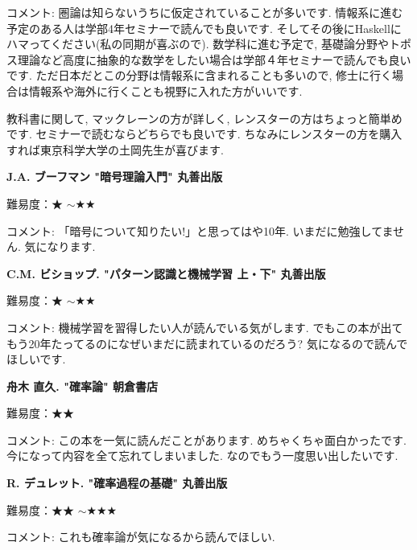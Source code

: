 コメント: 圏論は知らないうちに仮定されていることが多いです. 情報系に進む予定のある人は学部4年セミナーで読んでも良いです.  そしてその後にHaskellにハマってください(私の同期が喜ぶので). 数学科に進む予定で, 基礎論分野やトポス理論など高度に抽象的な数学をしたい場合は学部４年セミナーで読んでも良いです. ただ日本だとこの分野は情報系に含まれることも多いので, 修士に行く場合は情報系や海外に行くことも視野に入れた方がいいです. 

教科書に関して, マックレーンの方が詳しく, レンスターの方はちょっと簡単めです. セミナーで読むならどちらでも良いです. ちなみにレンスターの方を購入すれば東京科学大学の土岡先生が喜びます. 
\vspace{8pt}

\textbf{J.A. ブーフマン "暗号理論入門" 丸善出版}  　\vspace{-6pt} 

難易度：★ $\sim$★★\vspace{-6pt} 

コメント: 「暗号について知りたい!」と思ってはや10年. いまだに勉強してません. 気になります. 
\vspace{8pt}


\textbf{C.M. ビショップ. "パターン認識と機械学習 上・下" 丸善出版}  　\vspace{-6pt} 

難易度：★ $\sim$★★\vspace{-6pt} 

コメント: 機械学習を習得したい人が読んでいる気がします. でもこの本が出てもう20年たってるのになぜいまだに読まれているのだろう? 気になるので読んでほしいです. 
\vspace{8pt}

\textbf{舟木 直久. "確率論" 朝倉書店}  　\vspace{-6pt} 

難易度：★★\vspace{-6pt} 

コメント: この本を一気に読んだことがあります. めちゃくちゃ面白かったです. 今になって内容を全て忘れてしまいました. なのでもう一度思い出したいです. 
\vspace{8pt}

\textbf{R. デュレット. "確率過程の基礎" 丸善出版}  　\vspace{-6pt} 

難易度：★★ $\sim$★★★\vspace{-6pt} 

コメント: これも確率論が気になるから読んでほしい. 
\vspace{8pt}

